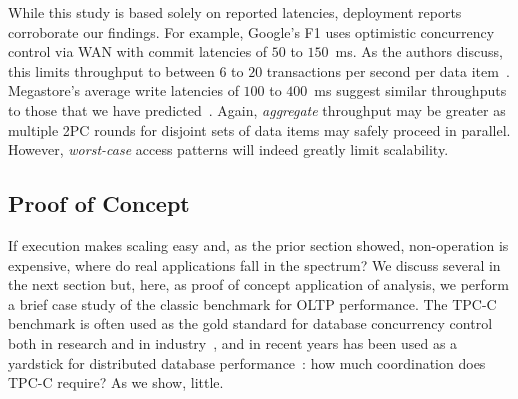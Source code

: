 While this study is based solely on reported latencies, deployment
reports corroborate our findings. For example, Google's F1 uses
optimistic concurrency control via WAN with commit latencies of $50$
to $150$~ms. As the authors discuss, this limits throughput to between
$6$ to $20$ transactions per second per data
item~\cite{f1}. Megastore's average write latencies of $100$ to
$400$~ms suggest similar throughputs to those that we have
predicted~\cite{megastore}. Again, \textit{aggregate} throughput may
be greater as multiple 2PC rounds for disjoint sets of data items may
safely proceed in parallel. However, \textit{worst-case} access
patterns will indeed greatly limit scalability.

\subsection{Proof of Concept}

If \cfree execution makes scaling easy and, as the prior section
showed, non-\iconfluent operation is expensive, where do real
applications fall in the spectrum? We discuss several in the next
section but, here, as proof of concept application of \cfreedom
analysis, we perform a brief case study of the classic benchmark for
OLTP performance. The TPC-C benchmark is often used as the gold
standard for database concurrency control~\cite{oltpbench} both in
research and in industry~\cite{tpcc}, and in recent years has been
used as a yardstick for distributed database
performance~\cite{calvin,hstore,silo}: how much coordination does
TPC-C require? As we show, little.

